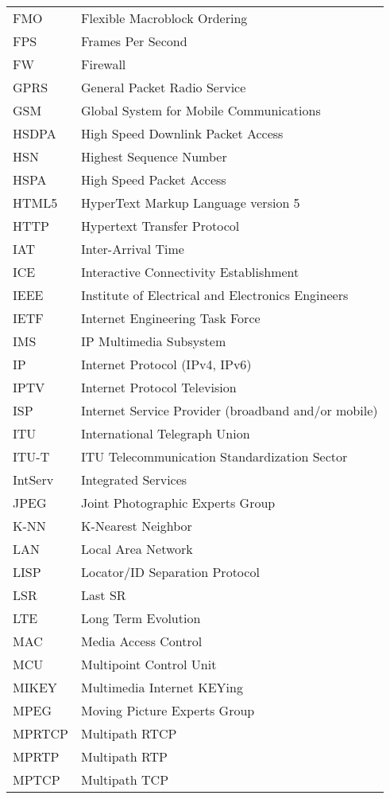 \begin{longtable}{ll}
FMO 	& Flexible Macroblock Ordering \\
FPS 	& Frames Per Second \\
FW  	& Firewall \\
GPRS 	& General Packet Radio Service \\
GSM 	& Global System for Mobile Communications \\
HSDPA 	& High Speed Downlink Packet Access \\
HSN 	& Highest Sequence Number \\
HSPA 	& High Speed Packet Access \\
HTML5	& HyperText Markup Language version 5\\
HTTP 	& Hypertext Transfer Protocol \\
IAT  	& Inter-Arrival Time \\
ICE  	& Interactive Connectivity Establishment \\
IEEE 	& Institute of Electrical and Electronics Engineers \\
IETF	& Internet Engineering Task Force \\
IMS 	& IP Multimedia Subsystem \\
IP  	& Internet Protocol (IPv4, IPv6)\\
IPTV 	& Internet Protocol Television \\
ISP 	& Internet Service Provider (broadband and/or mobile) \\
ITU 	& International Telegraph Union \\
ITU-T 	& ITU Telecommunication Standardization Sector \\
IntServ	& Integrated Services \\
JPEG 	& Joint Photographic Experts Group \\
K-NN 	& K-Nearest Neighbor \\
LAN 	& Local Area Network \\
LISP 	& Locator/ID Separation Protocol\\
LSR 	& Last SR \\
LTE 	& Long Term Evolution \\
MAC 	& Media Access Control \\
MCU 	& Multipoint Control Unit \\
MIKEY	& Multimedia Internet KEYing \\
MPEG 	& Moving Picture Experts Group \\
MPRTCP	& Multipath RTCP \\
MPRTP 	& Multipath RTP \\
MPTCP 	& Multipath TCP \\

\end{longtable}

